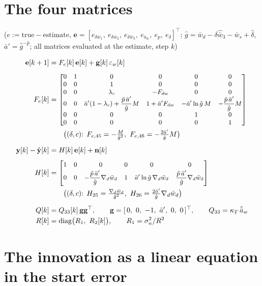 \documentclass[11pt,a4paper,fontset=none]{ctexart}
\newcommand{\ba}{\bar{a}}
\newcommand{\bw}{\bar{w}}
\newcommand{\ap}{\ba'}
\newcommand{\ah}{\hat{\ba}_w}
\newcommand{\gh}{\hat{g}}
\newcommand{\ph}{\hat{p}}
\newcommand{\dl}{\delta}
\begin{document}
\section{The four matrices}

($e := \text{true} - \text{estimate}$, $\mathbf{e} = [e_{\delta\bw_1},\ e_{\delta\bw_2},\ e_{\delta\bw_3},\ e_{\ba_w},\ e_p,\ e_{\dl}]^{\top}$;
$\gh = \bw_d - \delta\hat{\bw}_3 - \bw_s + \hat\dl$, $\ap = \gh^{-\ph}$; all matrices evaluated at the estimate, step $k$)

\begin{align*}
\mathbf{e}[k+1] &= F_e[k]\,\mathbf{e}[k] + \mathbf{g}[k]\,\varepsilon_w[k] \\[4pt]
F_e[k] &= {\small\begin{bmatrix}
0 & 1 & 0 & 0 & 0 & 0 \\
0 & 0 & 1 & 0 & 0 & 0 \\
0 & 0 & \lambda_c & -F_{dw} & 0 & 0 \\
0 & 0 & \ap(1-\lambda_c) + \dfrac{\ph\,\ap}{\gh}M & 1 + \ap F_{dw} & -\ap\ln\gh\,M & -\dfrac{\ph\,\ap}{\gh}M \\
0 & 0 & 0 & 0 & 1 & 0 \\
0 & 0 & 0 & 0 & 0 & 1
\end{bmatrix}} \\
&\qquad \bigl((\dl, c)\text{: } F_{e,45} = -\tfrac{M}{\gh^{2}},\ F_{e,46} = -\tfrac{2\ap}{\gh}M\bigr) \\[6pt]
\mathbf{y}[k] - \hat{\mathbf{y}}[k] &= H[k]\,\mathbf{e}[k] + \mathbf{n}[k] \\[4pt]
H[k] &= {\small\begin{bmatrix} 1 & 0 & 0 & 0 & 0 & 0 \\[2pt]
        0 & 0 & -\dfrac{\ph\,\ap}{\gh}\nabla_d\bw_d & 1 & \ap\ln\gh\,\nabla_d\bw_d & \dfrac{\ph\,\ap}{\gh}\nabla_d\bw_d \end{bmatrix}} \\
&\qquad \bigl((\dl, c)\text{: } H_{25} = \tfrac{\nabla_d\bw_d}{\gh^{2}},\ H_{26} = \tfrac{2\ap}{\gh}\nabla_d\bw_d\bigr) \\[6pt]
Q[k] &= Q_{33}[k]\,\mathbf{g}\mathbf{g}^{\top}, \qquad \mathbf{g} = [\,0,\ 0,\ -1,\ \ap,\ 0,\ 0\,]^{\top}, \qquad Q_{33} = \kappa_T\,\ah \\
R[k] &= \mathrm{diag}\bigl(R_1,\ R_2[k]\bigr), \qquad R_1 = \sigma_n^{2}/R^{2}
\end{align*}

\section{The innovation as a linear equation in the start error}
\end{document}
